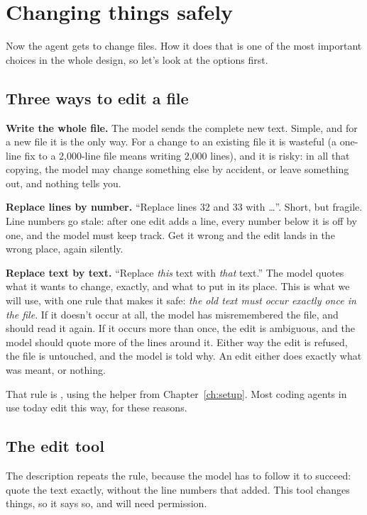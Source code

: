\chapter{Changing things safely}\label{ch:editing}

Now the agent gets to change files. How it does that is one of the most
important choices in the whole design, so let's look at the options first.

\section{Three ways to edit a file}

\textbf{Write the whole file.} The model sends the complete new text.
Simple, and for a new file it is the only way. For a change to an existing
file it is wasteful (a one-line fix to a 2,000-line file means writing
2,000 lines), and it is risky: in all that copying, the model may change
something else by accident, or leave something out, and nothing tells
you.

\textbf{Replace lines by number.} ``Replace lines 32 and 33 with \ldots''.
Short, but fragile. Line numbers go stale: after one edit adds a line,
every number below it is off by one, and the model must keep track. Get it
wrong and the edit lands in the wrong place, again silently.

\textbf{Replace text by text.} ``Replace \emph{this} text with \emph{that}
text.'' The model quotes what it wants to change, exactly, and what to put
in its place. This is what we will use, with one rule that makes it safe:
\emph{the old text must occur exactly once in the file}. If it doesn't
occur at all, the model has misremembered the file, and should read it
again. If it occurs more than once, the edit is ambiguous, and the model
should quote more of the lines around it. Either way the edit is refused,
the file is untouched, and the model is told why. An edit either does
exactly what was meant, or nothing.

That rule is , using the helper
from Chapter~\ref{ch:setup}. Most coding agents in use today edit this way,
for these reasons.

\section{The edit tool}

The description repeats the rule, because the model has to follow it to
succeed: quote the text exactly, without the line numbers that
 added. This tool changes things, so it says so, and will
need permission.

